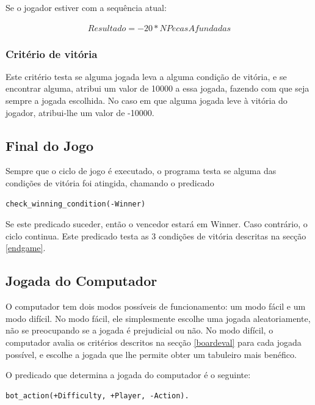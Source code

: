 \documentclass[a4paper]{article}
\begin{document}
Se o jogador estiver com a sequência atual:

\begin{equation*}
\begin{multlined}
Resultado = -20 * NPecasAfundadas
\end{multlined}
\end{equation*}

\subsubsection{Critério de vitória}

Este critério testa se alguma jogada leva a alguma condição de vitória, e se encontrar alguma, atribui um valor de 10000 a essa jogada, fazendo com que seja sempre a jogada escolhida. No caso em que alguma jogada leve à vitória do jogador, atribui-lhe um valor de -10000.

\subsection{Final do Jogo}

Sempre que o ciclo de jogo é executado, o programa testa se alguma das condições de vitória foi atingida, chamando o predicado

\begin{lstlisting}
check_winning_condition(-Winner)
\end{lstlisting}

Se este predicado suceder, então o vencedor estará em Winner. Caso contrário, o ciclo continua. Este predicado testa as 3 condições de vitória descritas na secção  \ref{endgame}. 

\subsection{Jogada do Computador}

O computador tem dois modos possíveis de funcionamento: um modo fácil e um modo difícil. No modo fácil, ele simplesmente escolhe uma jogada aleatoriamente, não se preocupando se a jogada é prejudicial ou não. No modo difícil, o computador avalia os critérios descritos na secção \ref{boardeval} para cada jogada possível, e escolhe a jogada que lhe permite obter um tabuleiro mais benéfico.

O predicado que determina a jogada do computador é o seguinte:

\begin{lstlisting}
bot_action(+Difficulty, +Player, -Action).
\end{lstlisting}
\end{document}
